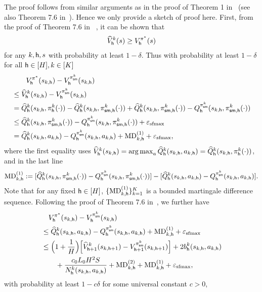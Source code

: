 The proof follows from similar arguments as in the proof of Theorem 1 in~\cite{azar2017minimax} (see also Theorem 7.6 in~\cite{agarwal2019reinforcement}). Hence we only provide a sketch of proof here.
First, from the proof of Theorem 7.6 in~\cite{agarwal2019reinforcement} , it can be shown that
\begin{align*}
 {\widehat{{{V}}}}_{\mathsf{h}}^k({s})\geq{{V}}^{{\pi^*}}_{\mathsf{h}}({s})
\end{align*}
for any $k,{\mathsf{h}},{s}$ with probability at least $1-\delta$.
Thus with probability at least $1-\delta$ for all ${\mathsf{h}}\in[{H}],k\in[{K}]$
\begin{align*}
&\qquad{{V}}_{\mathsf{h}}^{{\pi^*}}({s}_{k,{\mathsf{h}}})- {{V}}^{{\pi}^k_{\mathsf{sm}}}_{\mathsf{h}}({s}_{k,{\mathsf{h}}})  \\
&\leq
{\widehat{{{V}}}}^k_{\mathsf{h}}({s}_{k,{\mathsf{h}}})- {{V}}^{{\pi}^k_{\mathsf{sm}}}_{\mathsf{h}}({s}_{k,{\mathsf{h}}})  \\
&={\widehat{{Q}}}^k_{\mathsf{h}}({s}_{k,{\mathsf{h}}},{\pi}^k_{{\mathsf{h}}}(\cdot))-{\widehat{{Q}}}^k_{\mathsf{h}}({s}_{k,{\mathsf{h}}},{\pi}^k_{{\mathsf{sm}},{\mathsf{h}}}(\cdot))+{\widehat{{Q}}}^k_{\mathsf{h}}({s}_{k,{\mathsf{h}}},{\pi}^k_{{\mathsf{sm}},{\mathsf{h}}}(\cdot))-
{Q}^{{\pi}^k_{\mathsf{sm}}}_{\mathsf{h}}({s}_{k,{\mathsf{h}}},{\pi}^k_{{\mathsf{sm}},{\mathsf{h}}}(\cdot))\\
&\leq
{\widehat{{Q}}}^k_{\mathsf{h}}({s}_{k,{\mathsf{h}}},{\pi}^k_{{\mathsf{sm}},{\mathsf{h}}}(\cdot))-
{Q}^{{\pi}^k_{\mathsf{sm}}}_{\mathsf{h}}({s}_{k,{\mathsf{h}}},{\pi}^k_{{\mathsf{sm}},{\mathsf{h}}}(\cdot))+{\varepsilon_{\mathrm{sfmax}}}\\
&=
{\widehat{{Q}}}^k_{\mathsf{h}}({s}_{k,{\mathsf{h}}},{a}_{k,{\mathsf{h}}})-
{Q}^{{\pi}^k_{\mathsf{sm}}}_{\mathsf{h}}({s}_{k,{\mathsf{h}}},{a}_{k,{\mathsf{h}}})+{\mathrm{MD}}^{(1)}_{k,{\mathsf{h}}}+{\varepsilon_{\mathrm{sfmax}}},
\end{align*}
where the first equality uses ${\widehat{{{V}}}}^k_{\mathsf{h}}({s}_{k,{\mathsf{h}}})=\operatorname*{arg\,max}_{{a}}{\widehat{{Q}}}^k_{\mathsf{h}}({s}_{k,{\mathsf{h}}},{a}_{k,{\mathsf{h}}})={\widehat{{Q}}}^k_{\mathsf{h}}({s}_{k,{\mathsf{h}}},{\pi}_{\mathsf{h}}^k(\cdot))$, and in the last line $$
{\mathrm{MD}}^{(1)}_{k,{\mathsf{h}}}:=[{\widehat{{Q}}}^k_{\mathsf{h}}({s}_{k,{\mathsf{h}}},{\pi}^k_{{\mathsf{sm}},{\mathsf{h}}}(\cdot))-
{Q}^{{\pi}^k_{\mathsf{sm}}}_{\mathsf{h}}({s}_{k,{\mathsf{h}}},{\pi}^k_{{\mathsf{sm}},{\mathsf{h}}}(\cdot))]-[{\widehat{{Q}}}^k_{\mathsf{h}}({s}_{k,{\mathsf{h}}},{a}_{k,{\mathsf{h}}})-
{Q}^{{\pi}^k_{\mathsf{sm}}}_{\mathsf{h}}({s}_{k,{\mathsf{h}}},{a}_{k,{\mathsf{h}}})].
$$  Note that for any fixed ${\mathsf{h}}\in[{H}]$, $\{{\mathrm{MD}}^{(1)}_{k,{\mathsf{h}}}\}_{k=1}^{{K}}$ is a bounded martingale difference sequence. Following  the proof of Theorem 7.6 in~\cite{agarwal2019reinforcement}, we further have
\begin{align*}
&\quad{{V}}_{\mathsf{h}}^{{\pi^*}}({s}_{k,{\mathsf{h}}})- {{V}}^{{\pi}^k_{\mathsf{sm}}}_{\mathsf{h}}({s}_{k,{\mathsf{h}}})\\
&\leq {\widehat{{Q}}}^k_{\mathsf{h}}({s}_{k,{\mathsf{h}}},{a}_{k,{\mathsf{h}}})-
{Q}^{{\pi}^k_{\mathsf{sm}}}_{\mathsf{h}}({s}_{k,{\mathsf{h}}},{a}_{k,{\mathsf{h}}})+
{\mathrm{MD}}^{(1)}_{k,{\mathsf{h}}}+{\varepsilon_{\mathrm{sfmax}}}\\
&\leq
\Big(1+\frac{1}{{H}}\Big)\Big[{\widehat{{{V}}}}_{{\mathsf{h}}+1}^k({s}_{k,{\mathsf{h}}+1})- {{V}}^{{\pi}^k_{\mathsf{sm}}}_{{\mathsf{h}}+1}({s}_{k,{\mathsf{h}}+1})  \Big]+2{b}_{\mathsf{h}}^k({s}_{k,{\mathsf{h}}},{a}_{k,{\mathsf{h}}})
\\
&\qquad+
\frac{c_0L_0{H}^2{S}}{{N}^k_{\mathsf{h}}({s}_{k,{\mathsf{h}}},{a}_{k,{\mathsf{h}}})}+{\mathrm{MD}}^{(2)}_{k,{\mathsf{h}}}+{\mathrm{MD}}^{(1)}_{k,{\mathsf{h}}}+{\varepsilon_{\mathrm{sfmax}}},
\end{align*}with probability at least $1-c\delta$ for some universal constant $c>0$,
